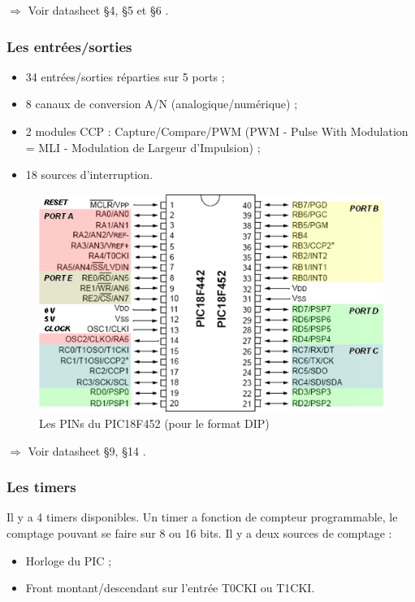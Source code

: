 \documentclass[a4paper]{article}
\begin{document}
$\Rightarrow$ Voir datasheet §4, §5 et §6 \cite{PIC18FXX2}.

\subsubsection{Les entrées/sorties}

\begin{itemize}
	\item 34 entrées/sorties réparties sur 5 ports ;
	\item 8 canaux de conversion A/N (analogique/numérique) ;
	\item 2 modules CCP : Capture/Compare/PWM (PWM - Pulse With Modulation = MLI - Modulation de Largeur d'Impulsion) ;
	\item 18 sources d'interruption.
\end{itemize}

\begin{figure}[H]
	\centering
	\includegraphics[scale=0.75]{Images/Pins_PIC18F452.png}
	\caption{Les PINs du PIC18F452 (pour le format DIP)
		\label{Pins_PIC18F452}}
\end{figure}

$\Rightarrow$ Voir datasheet §9, §14 \cite{PIC18FXX2}.

\subsubsection{Les timers}

Il y a 4 timers disponibles. Un timer a fonction de compteur programmable, le comptage pouvant se faire sur 8 ou 16 bits. Il y a deux sources de comptage :

\begin{itemize}
	\item Horloge du PIC ;
	\item Front montant/descendant sur l'entrée T0CKI ou T1CKI.
\end{itemize}
\end{document}
